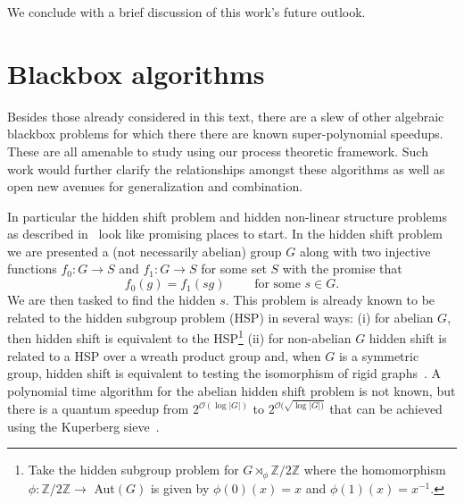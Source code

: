 We conclude with a brief discussion of this work's future outlook.

\section{Blackbox algorithms}

Besides those already considered in this text, there are a slew of other algebraic blackbox problems for which there there are known super-polynomial speedups. These are all amenable to study using our process theoretic framework. Such work would further clarify the relationships amongst these algorithms as well as open new avenues for generalization and combination.

In particular the hidden shift problem and hidden non-linear structure problems as described in~\cite{childs2010quantum} look like promising places to start. In the hidden shift problem we are presented a (not necessarily abelian) group $G$ along with two injective functions $f_0:G\to S$ and $f_1:G\to S$ for some set $S$ with the promise that
\begin{equation}
f_0(g) = f_1(sg) \qquad \mbox{ for some }s\in G.
\end{equation}
We are then tasked to find the hidden $s$. This problem is already known to be related to the hidden subgroup problem (HSP) in several ways: (i) for abelian $G$, then hidden shift is equivalent to the HSP\footnote{Take the hidden subgroup problem for $G\rtimes_{\phi}\mathbb{Z}/2\mathbb{Z}$ where the homomorphism $\phi:\mathbb{Z}/2\mathbb{Z}\to$ Aut$(G)$ is given by $\phi(0)(x)= x$ and $\phi(1)(x)=x^{-1}$.} (ii) for non-abelian $G$ hidden shift is related to a HSP over a wreath product group and, when $G$ is a symmetric group, hidden shift is equivalent to testing the isomorphism of rigid graphs~\cite{childs2010quantum}. A polynomial time algorithm for the abelian hidden shift problem is not known, but there is a quantum speedup from $2^{\mathcal{O}(\log |G|)}$ to $2^{\mathcal{O}(\sqrt{\log |G|)}}$ that can be achieved using the Kuperberg sieve~\cite{childs2010quantum,kuperberg2005subexponential}.


